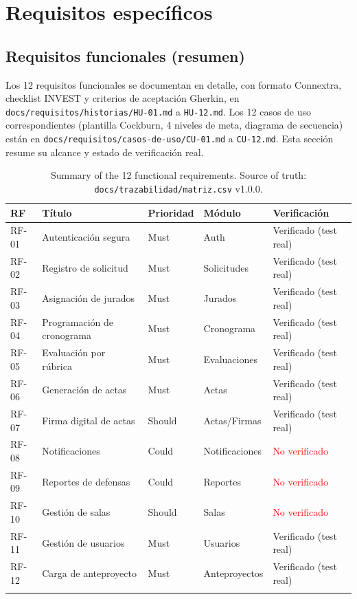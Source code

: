 \documentclass[11pt,a4paper]{article}
\begin{document}
\section{Requisitos específicos}

\subsection{Requisitos funcionales (resumen)}

Los 12 requisitos funcionales se documentan en detalle, con formato Connextra, checklist INVEST y
criterios de aceptación Gherkin, en \texttt{docs/requisitos/historias/HU-01.md} a \texttt{HU-12.md}. Los
12 casos de uso correspondientes (plantilla Cockburn, 4 niveles de meta, diagrama de secuencia) están en
\texttt{docs/requisitos/casos-de-uso/CU-01.md} a \texttt{CU-12.md}. Esta sección resume su alcance y
estado de verificación real.

\begin{longtable}{p{1.2cm} p{3.8cm} p{1.6cm} p{2.2cm} p{3cm}}
\toprule
\textbf{RF} & \textbf{Título} & \textbf{Prioridad} & \textbf{Módulo} & \textbf{Verificación} \\
\midrule
\endhead
RF-01 & Autenticación segura & Must & Auth & \textcolor{green!50!black}{Verificado (test real)} \\
RF-02 & Registro de solicitud & Must & Solicitudes & \textcolor{green!50!black}{Verificado (test real)} \\
RF-03 & Asignación de jurados & Must & Jurados & \textcolor{green!50!black}{Verificado (test real)} \\
RF-04 & Programación de cronograma & Must & Cronograma & \textcolor{green!50!black}{Verificado (test real)} \\
RF-05 & Evaluación por rúbrica & Must & Evaluaciones & \textcolor{green!50!black}{Verificado (test real)} \\
RF-06 & Generación de actas & Must & Actas & \textcolor{green!50!black}{Verificado (test real)} \\
RF-07 & Firma digital de actas & Should & Actas/Firmas & \textcolor{green!50!black}{Verificado (test real)} \\
RF-08 & Notificaciones & Could & Notificaciones & \textcolor{red}{No verificado} \\
RF-09 & Reportes de defensas & Could & Reportes & \textcolor{red}{No verificado} \\
RF-10 & Gestión de salas & Should & Salas & \textcolor{red}{No verificado} \\
RF-11 & Gestión de usuarios & Must & Usuarios & \textcolor{green!50!black}{Verificado (test real)} \\
RF-12 & Carga de anteproyecto & Must & Anteproyectos & \textcolor{green!50!black}{Verificado (test real)} \\
\bottomrule
\caption{Summary of the 12 functional requirements. Source of truth: \texttt{docs/trazabilidad/matriz.csv} v1.0.0.}
\end{longtable}
\end{document}
